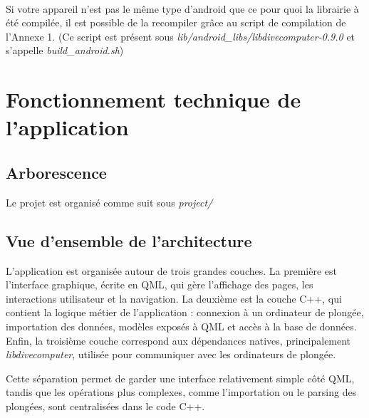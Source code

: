 \documentclass{article}
\begin{document}
\paragraph{}
Si votre appareil n'est pas le même type d'android que ce pour quoi la librairie à été compilée, il est possible de la recompiler grâce au script de compilation de l'Annexe 1. (Ce script est présent sous \textit{lib/android\_libs/libdivecomputer-0.9.0} et s'appelle \textit{build\_android.sh})

\section{Fonctionnement technique de l'application}

\subsection{Arborescence}
Le projet est organisé comme suit sous \textit{project/}

\paragraph{}
\begin{minipage}{1\textwidth} 
\end{minipage}

\subsection{Vue d'ensemble de l'architecture}
L'application est organisée autour de trois grandes couches. La première est
l'interface graphique, écrite en QML, qui gère l'affichage des pages, les
interactions utilisateur et la navigation. La deuxième est la couche C++, qui
contient la logique métier de l'application : connexion à un ordinateur de
plongée, importation des données, modèles exposés à QML et accès à la base de
données. Enfin, la troisième couche correspond aux dépendances natives,
principalement \textit{libdivecomputer}, utilisée pour communiquer avec les
ordinateurs de plongée.

Cette séparation permet de garder une interface relativement simple côté QML,
tandis que les opérations plus complexes, comme l'importation ou le parsing des
plongées, sont centralisées dans le code C++.
\end{document}
